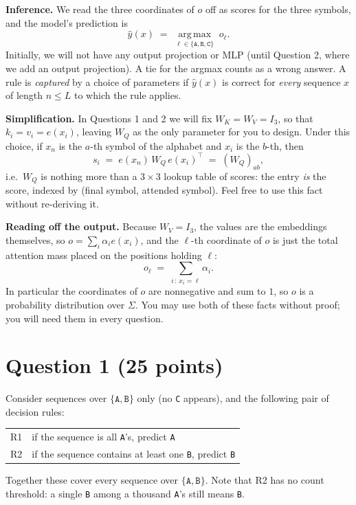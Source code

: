 \documentclass[11pt]{article}
\newcommand{\wrd}[1]{\texttt{#1}}
\newcommand{\emb}[1]{\ensuremath{e(#1)}}
\newcommand{\Wq}{\ensuremath{W_Q}}
\newcommand{\Wk}{\ensuremath{W_K}}
\newcommand{\Wv}{\ensuremath{W_V}}
\newcommand{\pred}{\ensuremath{\hat{y}}}
\begin{document}
\medskip\noindent
\textbf{Inference.} We read the three coordinates of $o$ off as scores for the three symbols, and the model's
prediction is
\[
\pred(x) \;=\; \operatorname*{arg\,max}_{\ell \in \{\wrd{A},\wrd{B},\wrd{C}\}} \; o_\ell .
\]
Initially, we will not have any output projection or MLP (until Question 2, where we add an output
projection). A tie for the argmax counts as a wrong answer.
A rule is \emph{captured} by a choice of parameters if $\pred(x)$ is correct for
\emph{every} sequence $x$ of length $n \le L$ to which the rule applies.

\medskip\noindent
\textbf{Simplification.} In Questions 1 and 2 we will fix $\Wk = \Wv = I_3$, so that $k_i = v_i = \emb{x_i}$,
leaving $\Wq$ as the only parameter for you to design. Under this choice, if $x_n$ is the $a$-th symbol of the alphabet and $x_i$ is the
$b$-th, then
\[
s_i \;=\; \emb{x_n}\,\Wq\,\emb{x_i}^{\top} \;=\; (\Wq)_{ab} ,
\]
i.e.\ $\Wq$ is nothing more than a $3\times 3$ lookup table of scores: the entry \emph{is} the score, indexed by (final symbol, attended
symbol). Feel free to use this fact without re-deriving it.

\medskip\noindent
\textbf{Reading off the output.} Because $\Wv = I_3$, the values are the embeddings themselves, so
$o = \sum_i \alpha_i \emb{x_i}$, and the $\ell$-th coordinate of $o$ is just the total attention mass placed on
the positions holding $\ell$:
\[
o_\ell \;=\; \sum_{i \,:\, x_i = \ell} \alpha_i .
\]
In particular the coordinates of $o$ are nonnegative and sum to $1$, so $o$ is a probability distribution over
$\Sigma$. You may use both of these facts without proof; you will need them in every question.

\section{Question 1 (25 points)}

Consider sequences over $\{\wrd{A}, \wrd{B}\}$ only (no \wrd{C} appears), and the following pair of decision
rules:
\begin{center}
\begin{tabular}{ll}
\toprule
R1 & if the sequence is all \wrd{A}'s, predict \wrd{A}\\
R2 & if the sequence contains at least one \wrd{B}, predict \wrd{B}\\
\bottomrule
\end{tabular}
\end{center}
Together these cover every sequence over $\{\wrd{A},\wrd{B}\}$. Note that R2 has no count threshold: a single
\wrd{B} among a thousand \wrd{A}'s still means \wrd{B}.
\end{document}

